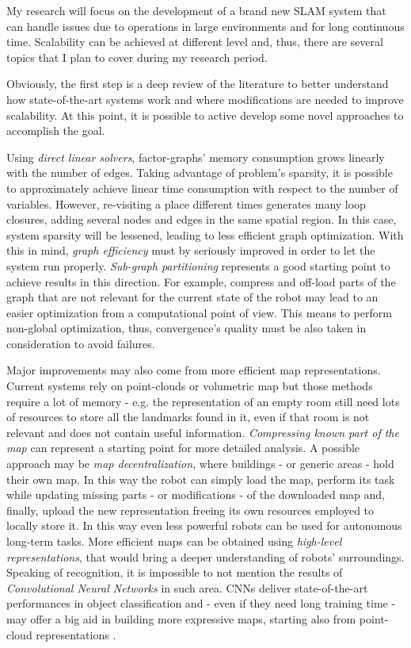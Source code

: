 \documentclass[10pt,a4paper, notitlepage]{report}
\begin{document}
My research will focus on the development of a brand new SLAM system that can handle issues due to operations in large environments and for long continuous time. Scalability can be achieved at different level and, thus, there are several topics that I plan to cover during my research period.

Obviously, the first step is a deep review of the literature to better understand how state-of-the-art systems work and where modifications are needed to improve scalability. At this point, it is possible to active develop some novel approaches to accomplish the goal.

Using \textit{direct linear solvers}, factor-graphs' memory consumption grows linearly with the number of edges. Taking advantage of problem's sparsity, it is possible to approximately achieve linear time consumption with respect to the number of variables. However, re-visiting a place different times generates many loop closures, adding several nodes and edges in the same spatial region. In this case, system sparsity will be lessened, leading to less efficient graph optimization. With this in mind, \textit{graph efficiency} must by seriously improved in order to let the system run properly. \textit{Sub-graph partitioning} \cite{grisetti2012condensed-m} represents a good starting point to achieve results in this direction. For example, compress and off-load parts of the graph that are not relevant for the current state of the robot may lead to an easier optimization from a computational point of view. This means to perform non-global optimization, thus, convergence's quality must be also taken in consideration to avoid failures.

Major improvements may also come from more efficient map representations. Current systems rely on point-clouds or volumetric map but those methods require a lot of memory - e.g. the representation of an empty room still need lots of resources to store all the landmarks found in it, even if that room is not relevant and does not contain useful information. \textit{Compressing known part of the map} \cite{lynen2015getoutofmylab} can represent a starting point for more detailed analysis. A possible approach may be \textit{map decentralization}, where buildings - or generic areas - hold their own map. In this way the robot can simply load the map, perform its task while updating missing parts - or modifications - of the downloaded map and, finally, upload the new representation freeing its own resources employed to locally store it. In this way even less powerful robots can be used for autonomous long-term tasks. More efficient maps can be obtained using \textit{high-level representations}, that would bring a deeper understanding of robots' surroundings. Speaking of recognition, it is impossible to not mention the results of \textit{Convolutional Neural Networks} \cite{krizhevsky2012alexnet} in such area. CNNs deliver state-of-the-art performances in object classification and - even if they need long training time - may offer a big aid in building more expressive maps, starting also from point-cloud representations \cite{maturana2015voxnet}.
\end{document}
